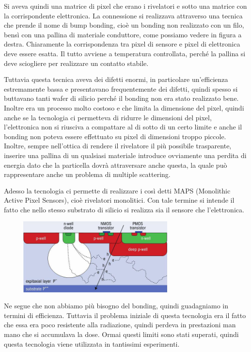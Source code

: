 Si aveva quindi una matrice di pixel che erano i rivelatori e sotto una matrice con la corrispondente elettronica. La connessione si realizzava attraverso una tecnica che prende il nome di bump bonding, cioè un bonding non realizzato con un filo, bensì con una pallina di materiale conduttore, come possiamo vedere in figura a destra. Chiaramente la corrispondenza tra pixel di sensore e pixel di elettronica deve essere esatta. Il tutto avviene a temperatura controllata, perché la pallina si deve sciogliere per realizzare un contatto stabile.

Tuttavia questa tecnica aveva dei difetti enormi, in particolare un'efficienza estremamente bassa e presentavano frequentemente dei difetti, quindi spesso si buttavano tanti wafer di silicio perché il bonding non era stato realizzato bene. Inoltre era un processo molto costoso e che limita la dimensione del pixel, quindi anche se la tecnologia ci permetteva di ridurre le dimensioni del pixel, l'elettronica non si riusciva a compattare al di sotto di un certo limite e anche il bonding non poteva essere effettuato su pixel di dimensioni troppo piccole. Inoltre, sempre nell'ottica di rendere il rivelatore il più possibile trasparente, inserire una pallina di un qualsiasi materiale introduce ovviamente una perdita di energia dato che la particella dovrà attraversare anche questa, la quale può rappresentare anche un problema di multiple scattering. 

Adesso la tecnologia ci permette di realizzare i così detti MAPS (Monolithic Active Pixel Sensors), cioè rivelatori monolitici. Con tale termine si intende il fatto che nello stesso substrato di silicio si realizza sia il sensore che l'elettronica.
\begin{figure}[H]
   \centering
   \includegraphics[width=0.7\textwidth]{immagini/rivelatore_monolitico.png}
\end{figure}
Ne segue che non abbiamo più bisogno del bonding, quindi guadagniamo in termini di efficienza. Tuttavia il problema iniziale di questa tecnologia era il fatto che essa era poco resistente alla radiazione, quindi perdeva in prestazioni man mano che si accumulava la dose. Ormai questi limiti sono stati superati, quindi questa tecnologia viene utilizzata in tantissimi esperimenti.